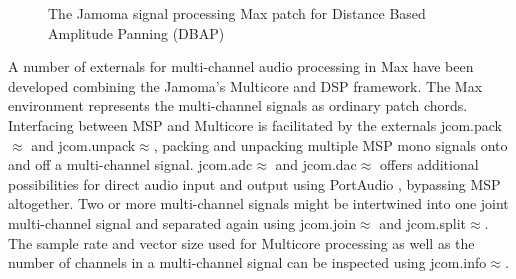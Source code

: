 \documentclass[twoside,a4paper]{article}
\begin{document}
\begin{figure}[!t]
\centering
{} \hspace{0.4cm}
\caption{The Jamoma signal processing Max patch for Distance Based Amplitude Panning (DBAP)}
\label{fig:max-before-after}
\end{figure}

A number of externals for multi-channel audio processing in Max have been developed combining the Jamoma's Multicore and DSP framework. 
The Max environment represents the multi-channel signals as ordinary patch chords. 
Interfacing between MSP and Multicore is facilitated by the externals jcom.pack$\approx$ and jcom.unpack$\approx$, packing and unpacking multiple MSP mono signals onto and off a multi-channel signal. 
jcom.adc$\approx$ and jcom.dac$\approx$ offers additional possibilities for direct audio input and output using PortAudio \cite{Bencina:2003}, bypassing MSP altogether. 
Two or more multi-channel signals might be intertwined into one joint multi-channel signal and separated again using jcom.join$\approx$ and jcom.split$\approx$.
The sample rate and vector size used for Multicore processing as well as the number of channels in a multi-channel signal can be inspected using jcom.info$\approx$.
\end{document}
